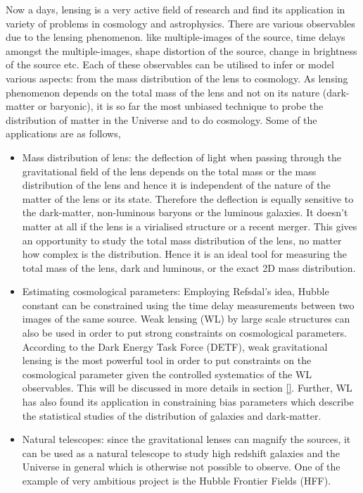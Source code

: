 Now a days, lensing is a very active field of research and find its application
in variety of problems in cosmology and astrophysics. 
There are various observables due to the lensing phenomenon. like multiple-images of the source, time 
delays amongst the multiple-images, shape distortion of the source, change in brightness
of the source etc. Each of these observables can be utilised to infer or model various
aspects: from the mass distribution of the lens to cosmology. As lensing phenomenon depends 
on the total mass of the lens and not on its nature (dark-matter or baryonic), it is
so far the most unbiased technique to probe the distribution of matter in the Universe
and to do cosmology.
Some of the applications are as follows,
\begin{itemize}
	\item Mass distribution of lens: the deflection of light when passing through
			the gravitational field of the lens depends on the total mass or the
			mass distribution of the lens and hence it is independent of the nature
			of the matter of the lens or its state. Therefore the
			deflection is equally sensitive to the dark-matter, non-luminous baryons
			or the luminous galaxies. It doesn't matter at all if the lens is a 
			virialised structure or a recent merger. This gives an opportunity to 
			study the total mass distribution of the lens, no matter how complex is 
			the distribution. Hence it is an ideal tool for measuring the total mass
			of the lens, dark and luminous, or the exact 2D mass distribution. 

	\item Estimating cosmological parameters: Employing Refsdal's idea, Hubble constant
			can be constrained using the time delay measurements between two images
			of the same source. Weak lensing (WL) by large scale structures 
			can also be used in order to put
			strong constraints on cosmological parameters. According to the Dark 
			Energy Task Force (DETF), weak gravitational lensing is the most powerful
			tool in order to put constraints on the cosmological parameter given
			the controlled systematics of the WL observables. This will be discussed
			in more details in section \ref{}. Further, WL has also found its application
			in constraining bias parameters which describe the statistical studies
			of the distribution of galaxies and dark-matter. 

	\item Natural telescopes: since the gravitational lenses can magnify the sources, it 
			can be used as a natural telescope to study high redshift galaxies and the Universe
			in general which is otherwise not possible to observe. One of the example of 
			very ambitious project is the Hubble Frontier Fields (HFF). 
\end{itemize}


